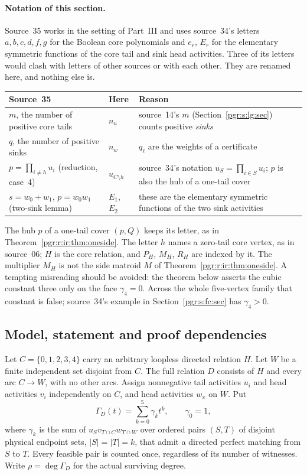 \documentclass[11pt]{article}
\numberwithin{equation}{section}
\theoremstyle{definition}\newtheorem{definition}[theorem]{Definition}\newtheorem{remark}[theorem]{Remark}
\begin{document}
\paragraph{Notation of this section.}
Source~35 works in the setting of Part~III and uses source~34's letters
$a,b,c,d,f,g$ for the Boolean core polynomials and $e_r$, $E_r$ for the
elementary symmetric functions of the core tail and sink head activities.
Three of its letters would clash with letters of other sources or with each
other. They are renamed here, and nothing else is.
\begin{center}\small
\begin{tabular}{p{50mm}p{24mm}p{66mm}}
\toprule
Source~35 & Here & Reason\\\midrule
$m$, the number of positive core tails & $n_u$ & source~14's $m$
  (Section~\ref{pgr:s:lg:sec}) counts positive \emph{sinks}\\
$q$, the number of positive sinks & $n_w$ & $q_\ell$ are the weights of
  a certificate\\
$p=\prod_{i\ne h}u_i$ (reduction, case~4) & $u_{C\setminus h}$ & source~34's
  notation $u_S=\prod_{i\in S}u_i$; $p$ is also the hub of a one-tail
  cover\\
$s=w_0+w_1$, $p=w_0w_1$ (two-sink lemma) & $E_1$, $E_2$ & these are the
  elementary symmetric functions of the two sink activities\\\bottomrule
\end{tabular}
\end{center}
The hub $p$ of a one-tail cover $(p,Q)$ keeps its letter, as in
Theorem~\ref{pgr:r:ir:thm:oneside}. The letter $h$ names a zero-tail core
vertex, as in source~06; $H$ is the core relation, and $P_H$, $M_H$, $R_H$
are indexed by it. The multiplier $M_H$ is not the side matroid $M$ of
Theorem~\ref{pgr:r:ir:thm:oneside}. A tempting misreading should be
avoided: the theorem below asserts the cubic constant three only on the
face $\gamma_4=0$. Across the whole five-vertex family that constant is
false; source~34's example in Section~\ref{pgr:s:fc:sec} has $\gamma_4>0$.

\subsection{Model, statement and proof dependencies}
Let $C=\{0,1,2,3,4\}$ carry an arbitrary loopless directed relation $H$. Let $W$ be a finite independent set disjoint from $C$. The full relation $D$ consists of $H$ and every arc $C\to W$, with no other arcs. Assign nonnegative tail activities $u_i$ and head activities $v_i$ independently on $C$, and head activities $w_x$ on $W$. Put
\[
 \Gamma_D(t)=\sum_{k=0}^5\gamma_k t^k,\qquad \gamma_0=1,
\]
where $\gamma_k$ is the sum of
$u_Sv_{T\cap C}w_{T\cap W}$ over ordered pairs $(S,T)$ of disjoint physical endpoint sets, $|S|=|T|=k$, that admit a directed perfect matching from $S$ to $T$. Every feasible pair is counted once, regardless of its number of witnesses. Write $\rho=\deg\Gamma_D$ for the actual surviving degree.
\end{document}
